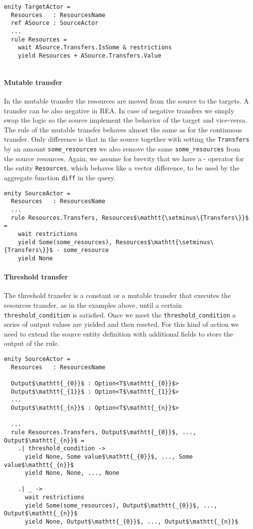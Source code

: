 \begin{lstlisting}[mathescape]
enity TargetActor =
  Resources   : ResourcesName
  ref ASource : SourceActor
  ...
  rule Resources =
    wait ASource.Transfers.IsSome & restrictions
    yield Resources + ASource.Transfers.Value
   
\end{lstlisting}


\paragraph*{Mutable transfer}
In the mutable transfer the resources are moved from the source to the targets. A transfer can be also negative in REA. In case of negative transfers we simply swap the logic so the source implement the behavior of the target and vice-versa. The rule of the mutable transfer behaves almost the same as for the continuous transfer. Only difference is that in the source together with setting the \texttt{Transfers} by an amount \texttt{some\_resources} we also remove the same \texttt{some\_resources} from the source resources. Again, we assume for brevity that we have a - operator for the entity \texttt{Resources}, which behaves like a vector difference, to be used by the aggregate function \texttt{diff} in the query. 

\begin{lstlisting}[mathescape]
enity SourceActor =
  Resources   : ResourcesName
  ...
  rule Resources.Transfers, Resources$\mathtt{\setminus\{Transfers\}}$ = 
    wait restrictions
    yield Some(some_resources), Resources$\mathtt{\setminus\{Transfers\}}$ - some_resource
    yield None
\end{lstlisting}

\paragraph*{Threshold transfer}
The threshold transfer is a constant or a mutable transfer that executes the resources transfer, as in the examples above, until a certain \texttt{threshold\_condition} is satisfied. Once we meet the \texttt{threshold\_condition} a series of output values are yielded and then reseted. For this kind of action we need to extend the source entity definition with additional fields to store the output of the rule.

\begin{lstlisting}
enity SourceActor =
  Resources   : ResourcesName

  Output$\mathtt{_{0}}$ : Option<T$\mathtt{_{0}}$>
  Output$\mathtt{_{1}}$ : Option<T$\mathtt{_{1}}$>
  ...
  Output$\mathtt{_{n}}$ : Option<T$\mathtt{_{n}}$>
  
  ...
  rule Resources.Transfers, Output$\mathtt{_{0}}$, ..., Output$\mathtt{_{n}}$ = 
    .| threshold_condition ->
      yield None, Some value$\mathtt{_{0}}$, ..., Some value$\mathtt{_{n}}$
      yield None, None, ..., None
      
    .| _ ->    
      wait restrictions
      yield Some(some_resources), Output$\mathtt{_{0}}$, ..., Output$\mathtt{_{n}}$
      yield None, Output$\mathtt{_{0}}$, ..., Output$\mathtt{_{n}}$
\end{lstlisting}

